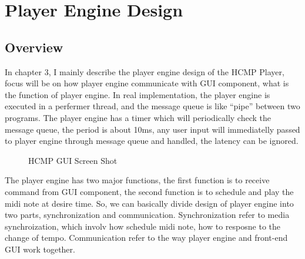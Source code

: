 
\chapter{Player Engine Design} %



\ifpdf
    \graphicspath{{X/figures/PNG/}{X/figures/PDF/}{X/figures/}}
\else
    \graphicspath{{X/figures/EPS/}{X/figures/}}
\fi

\section{Overview}
In chapter 3, I mainly describe the player engine design of the HCMP Player, 
focus will be on how player engine communicate with GUI component, what is the 
function of player engine. In real implementation, the player engine is 
executed in a perfermer thread, and the message queue is like ``pipe'' between 
two programs. The player engine has a timer which will periodically check the
message queue, the period is about 10ms, any user 
input will immediatelly passed to player engine through message queue and 
handled, the latency can be ignored. 

\begin{figure}[H]
\caption{HCMP GUI Screen Shot}
\label{fig:speciation}
\end{figure}

The player engine has two major functions, the first function is to receive 
command from GUI component, the second function is to schedule and play the
midi note at desire time. So, we can basically divide design of player engine  
into two parts, synchronization and communication. Synchronization refer to
media synchroization, which involv how schedule midi note, how to resposne to
the change of tempo. Communication refer to the way player engine and front-end  
GUI work together.

